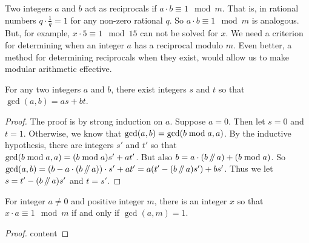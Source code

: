 Two integers $a$ and $b$ act as reciprocals if $a \cdot b\equiv 1\mod m$.
That is, in rational numbers $q\cdot \frac1q = 1$ for any non-zero rational $q$. So $a\cdot b\equiv 1\mod m$ is analogous. But, for example, $x\cdot 5\equiv 1\mod 15$ can not be solved for $x$. We need a criterion for determining when an integer $a$ has a reciprocal modulo $m$. Even better, a method for determining reciprocals when they exist, would allow us to make modular arithmetic effective. 

\begin{lem}
	For any two integers $a$ and $b$, there exist integers $s$ and $t$ so that $\gcd(a,b)=as+bt$.
	
	\begin{proof}
		The proof is by strong induction on $a$. 
		Suppose $a=0$.
		Then let $s=0$ and $t=1$. Otherwise, we know that $\gcd(a,b)=\gcd(b\bmod a, a)$. By the inductive hypothesis, there are integers $s'$ and $t'$
		so that $\gcd(b\bmod a, a)= (b\bmod a)s'+at'$. But also $b = a\cdot(b\mathop{/\mkern-5mu/} a)+(b\bmod a)$.
		So $\gcd(a,b) = (b-a\cdot(b\mathop{/\mkern-5mu/} a))\cdot s' + at'= a(t'-(b\mathop{/\mkern-5mu/} a)s') + bs'$. Thus we let $s=t'-(b\mathop{/\mkern-5mu/} a)s'$ and $t=s'$.
	\end{proof}
\end{lem}



\begin{thm}
	For integer $a\neq 0$ and positive integer $m$, there is an integer $x$ so that $x\cdot a\equiv 1\mod m$ if and only if $\gcd(a,m)=1$.
	
	\begin{proof}
	content
	\end{proof}
\end{thm}
